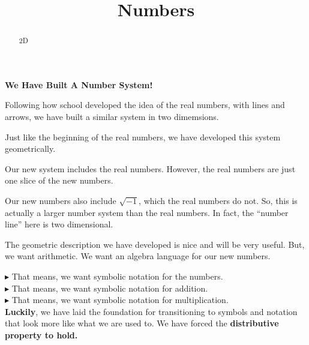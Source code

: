 \documentclass{ximera}
\title{Numbers}
\begin{document}
\begin{abstract}
2D
\end{abstract}
\maketitle





\begin{center}
\textbf{\textcolor{blue!55!black}{We Have Built A Number System!}} 
\end{center}


Following how school developed the idea of the real numbers, with lines and arrows, we have built a similar system in two dimemsions.



Just like the beginning of the real numbers, we have developed this system geometrically.  


Our new system includes the real numbers.  However, the real numbers are just one slice of the new numbers. 

Our new numbers also include $\sqrt{-1}$, which the real numbers do not.  So, this is actually a larger number system than the real numbers.  In fact, the ``number line'' here is two dimensional.








The geometric description we have developed is nice and will be very useful.  But, we want arithmetic. We want an algebra language for our new numbers.


\textbf{\textcolor{blue!55!black}{$\blacktriangleright$}} That means, we want symbolic notation for the numbers. \\

\textbf{\textcolor{blue!55!black}{$\blacktriangleright$}} That means, we want symbolic notation for addition. \\

\textbf{\textcolor{blue!55!black}{$\blacktriangleright$}} That means, we want symbolic notation for multiplication. \\



\textbf{\textcolor{red!80!black}{Luckily}}, we have laid the foundation for transitioning to symbols and notation that look more like what we are used to.   We have forced the \textbf{\textcolor{purple!85!blue}{distributive property to hold.}}
\end{document}
